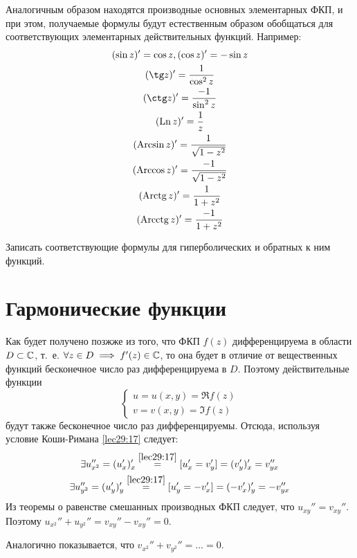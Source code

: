 \documentclass[../../main.tex]{subfiles}
\begin{document}
Аналогичным образом находятся производные основных элементарных ФКП, 
и при этом, получаемые формулы будут естественным образом обобщаться для
соответствующих элементарных действительных функций. Например:
\[
\begin{gathered}
(\sin z)' = \cos z, (\cos z)' = -\sin z\\
(\tg z)' = \dfrac{1}{\cos^2 z}\\ 
(\ctg z)' = \dfrac{-1}{\sin^2 z}\\
(\Ln z)' = \dfrac{1}{z}\\
(\Arcsin z)' = \dfrac{1}{\sqrt{1 - z^2}}\\
(\Arccos z)' = \dfrac{-1}{\sqrt{1 - z^2}}\\
(\Arctg z)' = \dfrac{1}{1 + z^2}\\
(\Arcctg z)' = \dfrac{-1}{1 + z^2}
\end{gathered}
\]
\begin{exc}
	Записать соответствующие формулы для гиперболических 
	и обратных к ним функций.
\end{exc}

\section{Гармонические функции}

Как будет получено позжже из того, что ФКП $ f(z) $ дифференцируема в области
$ D \subset \mathbb{C} $, т.~е. $ \forall z \in D \implies f'(z) \in \mathbb{C} $, то она 
будет
в отличие от вещественных функций бесконечное число раз дифференцируема в $ D 
$.
Поэтому действительные функции 
\[
\begin{cases}
	u = u(x, y) = \Re f(z)\\
	v = v(x, y) = \Im f(z)
\end{cases}
\]
будут также бесконечное число раз дифференцируемы. Отсюда, используя условие
Коши-Римана \eqref{lec29:17} следует:
\[
\begin{gathered}
\exists u_{x^2}'' = (u_x')_x' 
\stackrel{\eqref{lec29:17}}{=}
[u_x' = v_y'] = (v_y')_x' = v_{yx}''\\
\exists u_{y^2}'' = (u_y')_y' 
\stackrel{\eqref{lec29:17}}{=}
[u_y' = -v_x'] = (-v_x')_y' = -v_{yx}''\\
\end{gathered}
\]
Из теоремы о равенстве смешанных производных ФКП следует, что 
$ u_{xy}'' = v_{xy}'' $. Поэтому $ u_{x^2}'' + u_{y^2}'' = v_{xy}'' - v_{xy}'' 
= 0 $.

Аналогично показывается, что $ v_{x^2}'' + v_{y^2}'' = \dots = 0 $.
\end{document}
